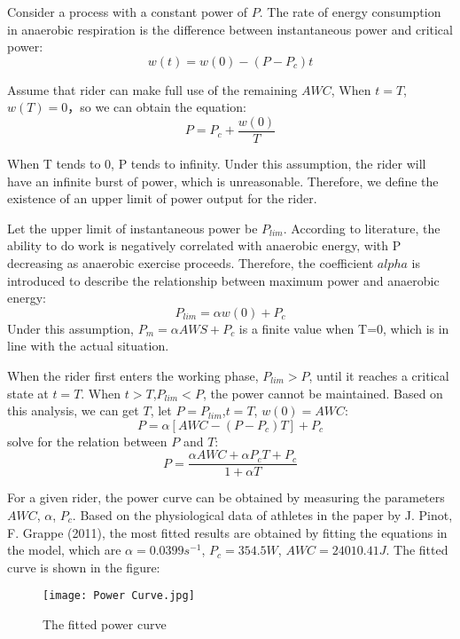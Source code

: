 \documentclass{mcmthesis}
\begin{document}
Consider a process with a constant power of $P$. The rate of energy consumption in anaerobic respiration is the difference between instantaneous power and critical power:
\begin{equation}
	w(t)=w(0)-(P-P_c)t
\end{equation}

Assume that rider can make full use of the remaining $AWC$, When $t=T$, $w(T)=0$，so we can obtain the equation:
\begin{equation}
	P=P_c+\frac{w(0)}{T}
\end{equation}

When T tends to 0, P tends to infinity. Under this assumption, the rider will have an infinite burst of power, which is unreasonable. Therefore, we define the existence of an upper limit of power output for the rider.

Let the upper limit of instantaneous power be $P_{lim}$. According to literature, the ability to do work is negatively correlated with anaerobic energy, with P decreasing as anaerobic exercise proceeds. Therefore, the coefficient $alpha$ is introduced to describe the relationship between maximum power and anaerobic energy:
\begin{equation}
	P_{lim}=\alpha w(0)+P_c
\end{equation}
Under this assumption, $P_m=\alpha AWS+P_c$ is a finite value when T=0, which is in line with the actual situation.

When the rider first enters the working phase, $P_ {lim} > P$, until it reaches a critical state at $t=T$. When $t>T$,$P_{lim}<P$, the power cannot be maintained. Based on this analysis, we can get $T$, let $P=P_{lim}$,$t=T$, $w(0)=AWC$:
\begin{equation}
	P=\alpha [AWC-(P-P_c)T]+P_c
\end{equation}
solve for the relation between $P$ and $T$:
\begin{equation}
	P=\frac{\alpha AWC+\alpha P_c T+P_c}{1+\alpha T}
\end{equation}

For a given rider, the power curve can be obtained by measuring the parameters $AWC$, $\alpha$, $P_c$. Based on the physiological data of athletes in the paper by J. Pinot, F. Grappe (2011), the most fitted results are obtained by fitting the equations in the model, which are $\alpha=0.0399 s^{-1}$, $P_c=354.5 W$, $AWC=24010.41 J$. The fitted curve is shown in the figure:
\begin{figure}[h]
	\centering
	\texttt{[image: Power Curve.jpg]}
	\caption{The fitted power curve} 
\end{figure}
\end{document}
